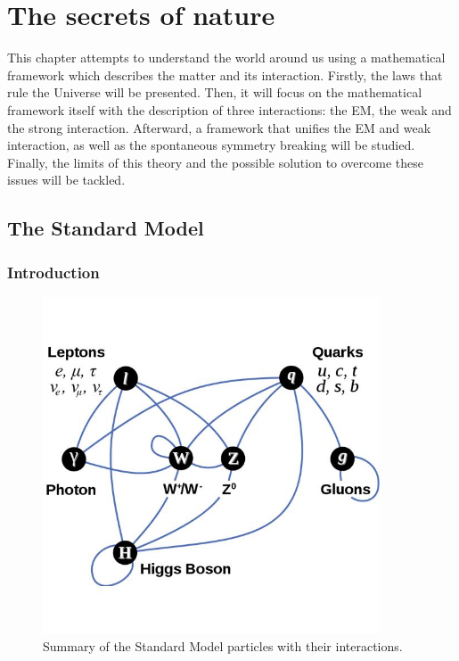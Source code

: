 \chapter{The secrets of nature}
\label{chap:SM}


  This chapter attempts to understand the world around us using a mathematical framework which describes the matter and its interaction.
  Firstly, the laws that rule the Universe will be presented.
  Then, it will focus on the mathematical framework itself with the description of three interactions: the \gls{EM}, the weak and the strong interaction.
  Afterward, a framework that unifies the \gls{EM} and weak interaction, as well as the spontaneous symmetry breaking will be studied.
  Finally, the limits of this theory and the possible solution to overcome these issues will be tackled.
 
  \minitoc
  \clearpage
  
  \section{The Standard Model}

    \subsection{Introduction}
     
    \begin{figure}[!h]
    \centering
      \includegraphics[width = 10cm]{Pictures/SM/elementaryParticles.jpg}
    \caption{Summary of the Standard Model particles with their interactions\cite{SM}.}
    \label{fig:partInterac}
    \end{figure}   
    
